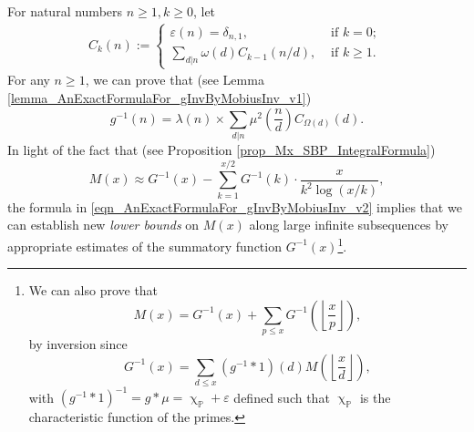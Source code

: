 \documentclass[11pt,reqno,a4letter]{article}
\numberwithin{figure}{section}
\numberwithin{table}{section}
\renewcommand{\chi}{\upchi}
\newcommand{\Floor}[2]{\ensuremath{\left\lfloor \frac{#1}{#2} \right\rfloor}}
\theoremstyle{plain}
\numberwithin{theorem}{section}
\theoremstyle{definition}
\newtheorem{remark}[theorem]{Remark}
\begin{document}

For natural numbers $n \geq 1, k \geq 0$, let 
\begin{align*} 
C_k(n) := \begin{cases} 
     \varepsilon(n) = \delta_{n,1}, & \text{ if $k = 0$; } \\ 
     \sum\limits_{d|n} \omega(d) C_{k-1}(n/d), & \text{ if $k \geq 1$. } 
     \end{cases} 
\end{align*} 
For any $n \geq 1$, we can prove that (see Lemma \ref{lemma_AnExactFormulaFor_gInvByMobiusInv_v1})
\begin{equation} 
\label{eqn_AnExactFormulaFor_gInvByMobiusInv_v2} 
g^{-1}(n) = \lambda(n) \times \sum_{d|n} \mu^2\left(\frac{n}{d}\right) C_{\Omega(d)}(d). 
\end{equation} 
In light of the fact that (see Proposition \ref{prop_Mx_SBP_IntegralFormula}) 
\[
M(x) \approx G^{-1}(x) - \sum_{k=1}^{x/2} G^{-1}(k) \cdot \frac{x}{k^2 \log(x/k)}, 
\]
the formula in \eqref{eqn_AnExactFormulaFor_gInvByMobiusInv_v2} 
implies that we can establish new \emph{lower bounds} on $M(x)$ along large infinite subsequences 
by appropriate estimates of the summatory function $G^{-1}(x)$\footnote{ 
     We can also prove that 
     \[
     M(x) = G^{-1}(x) + \sum_{p \leq x} G^{-1}\left(\Floor{x}{p}\right), 
     \] 
     by inversion since 
     \[
     G^{-1}(x) = \sum_{d \leq x} (g^{-1} \ast 1)(d) M\left(\Floor{x}{d}\right), 
     \]
     with $(g^{-1} \ast 1)^{-1} = g \ast \mu = \chi_{\mathbb{P}} + \varepsilon$ 
     defined such that $\chi_{\mathbb{P}}$ is the characteristic function of the primes. 
}. 
\end{document}
